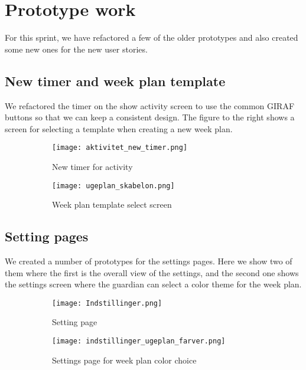 \section{Prototype work}
For this sprint, we have refactored a few of the older prototypes and also created some new ones for the new user stories.

\subsection{New timer and week plan template}
We refactored the timer on the show activity screen to use the common GIRAF buttons so that we can keep a consistent design. The figure to the right shows a screen for selecting a template when creating a new week plan.
\begin{figure}[H]
    \begin{subfigure}{0.5\textwidth}
    \texttt{[image: aktivitet\_new\_timer.png]}
    \caption{New timer for activity}
    \label{fig:activity_new_timer}
    \end{subfigure}
    \begin{subfigure}{0.5\textwidth}
        \texttt{[image: ugeplan\_skabelon.png]}
    \caption{Week plan template select screen}
    \label{fig:weekplan_template_screen}
    \end{subfigure} 
    \caption{}
    \label{activity_new_timer_and_weekplan_template_screen}
\end{figure}

\subsection{Setting pages}
We created a number of prototypes for the settings pages. Here we show two of them where the first is the overall view of the settings, and the second one shows the settings screen where the guardian can select a color theme for the week plan.
\begin{figure}[H]
    \begin{subfigure}{0.5\textwidth}
    \texttt{[image: Indstillinger.png]} 
    \caption{Setting page}
    \label{fig:settings}
    \end{subfigure}
    \begin{subfigure}{0.5\textwidth}
        \texttt{[image: indstillinger\_ugeplan\_farver.png]}
    \caption{Settings page for week plan color choice}
    \label{fig:settings_color_choice}
    \end{subfigure}
    \caption{} 
    \label{settings_and_settings_color_choice}
\end{figure}

